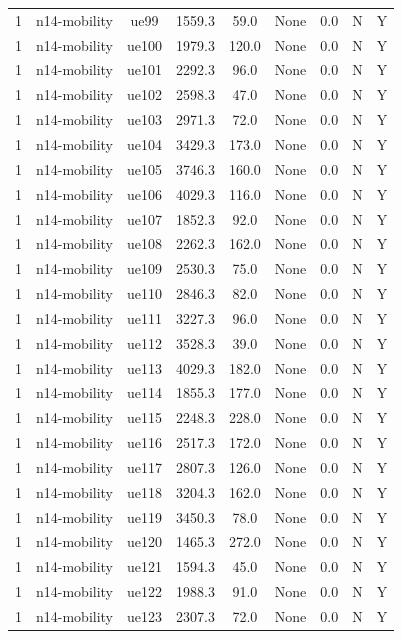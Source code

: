 \begin{table}[ht]
\begin{tabular}{|c|c|c|c|c|c|c|c|c|}
1 & n14-mobility & ue99 & 1559.3 & 59.0 & None & 0.0 & N & Y \\
1 & n14-mobility & ue100 & 1979.3 & 120.0 & None & 0.0 & N & Y \\
1 & n14-mobility & ue101 & 2292.3 & 96.0 & None & 0.0 & N & Y \\
1 & n14-mobility & ue102 & 2598.3 & 47.0 & None & 0.0 & N & Y \\
1 & n14-mobility & ue103 & 2971.3 & 72.0 & None & 0.0 & N & Y \\
1 & n14-mobility & ue104 & 3429.3 & 173.0 & None & 0.0 & N & Y \\
1 & n14-mobility & ue105 & 3746.3 & 160.0 & None & 0.0 & N & Y \\
1 & n14-mobility & ue106 & 4029.3 & 116.0 & None & 0.0 & N & Y \\
1 & n14-mobility & ue107 & 1852.3 & 92.0 & None & 0.0 & N & Y \\
1 & n14-mobility & ue108 & 2262.3 & 162.0 & None & 0.0 & N & Y \\
1 & n14-mobility & ue109 & 2530.3 & 75.0 & None & 0.0 & N & Y \\
1 & n14-mobility & ue110 & 2846.3 & 82.0 & None & 0.0 & N & Y \\
1 & n14-mobility & ue111 & 3227.3 & 96.0 & None & 0.0 & N & Y \\
1 & n14-mobility & ue112 & 3528.3 & 39.0 & None & 0.0 & N & Y \\
1 & n14-mobility & ue113 & 4029.3 & 182.0 & None & 0.0 & N & Y \\
1 & n14-mobility & ue114 & 1855.3 & 177.0 & None & 0.0 & N & Y \\
1 & n14-mobility & ue115 & 2248.3 & 228.0 & None & 0.0 & N & Y \\
1 & n14-mobility & ue116 & 2517.3 & 172.0 & None & 0.0 & N & Y \\
1 & n14-mobility & ue117 & 2807.3 & 126.0 & None & 0.0 & N & Y \\
1 & n14-mobility & ue118 & 3204.3 & 162.0 & None & 0.0 & N & Y \\
1 & n14-mobility & ue119 & 3450.3 & 78.0 & None & 0.0 & N & Y \\
1 & n14-mobility & ue120 & 1465.3 & 272.0 & None & 0.0 & N & Y \\
1 & n14-mobility & ue121 & 1594.3 & 45.0 & None & 0.0 & N & Y \\
1 & n14-mobility & ue122 & 1988.3 & 91.0 & None & 0.0 & N & Y \\
1 & n14-mobility & ue123 & 2307.3 & 72.0 & None & 0.0 & N & Y \\

\end{tabular}
\end{table}
